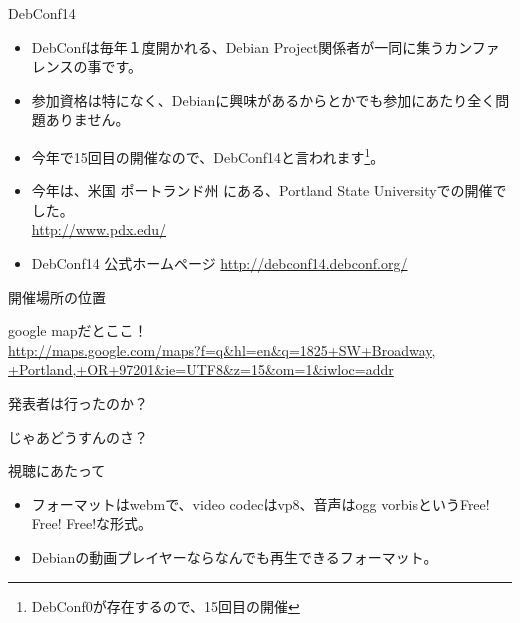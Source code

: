 \begin{frame}{DebConf14}

\begin{itemize}
 \item DebConfは毎年１度開かれる、Debian Project関係者が一同に集うカンファレンスの事です。
 \item 参加資格は特になく、Debianに興味があるからとかでも参加にあたり全く問題ありません。
 \item 今年で15回目の開催なので、DebConf14と言われます\footnote{DebConf0が存在するので、15回目の開催}。
 \item 今年は、米国 ポートランド州 にある、Portland State Universityでの開催でした。\\
   \url{http://www.pdx.edu/}
 \item DebConf14 公式ホームページ \url{http://debconf14.debconf.org/}
\end{itemize}

\end{frame}

\begin{frame}{開催場所の位置}

google mapだとここ！\\
\url{http://maps.google.com/maps?f=q&hl=en&q=1825+SW+Broadway, +Portland,+OR+97201&ie=UTF8&z=15&om=1&iwloc=addr}

\end{frame}

\begin{frame}{発表者は行ったのか？}


\end{frame}

\begin{frame}{じゃあどうすんのさ？}


\end{frame}

\begin{frame}{視聴にあたって}

\begin{itemize}
\item フォーマットはwebmで、video codecはvp8、音声はogg vorbisというFree! Free! Free!な形式。
\item Debianの動画プレイヤーならなんでも再生できるフォーマット。
\end{itemize}

\end{frame}


